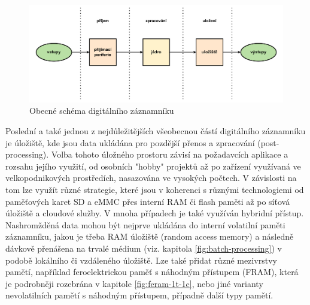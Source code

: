 \begin{figure}[h]
    \centering
    \includegraphics[width=1.00\textwidth]{obrazky-figures/common_digital_datalogger_scheme.pdf}
    \caption{Obecné schéma digitálního záznamníku}
    \label{fig:common-digital-datalogger}
\end{figure}

Poslední a také jednou z nejdůležitějších všeobecnou částí digitálního záznamníku je úložiště, kde jsou data ukládána pro pozdější přenos a zpracování (post-processing). Volba tohoto úložného prostoru závisí na požadavcích aplikace a rozsahu jejího využití, od osobních "hobby" projektů až po zařízení využívaná ve velkopodnikových prostředích, nasazována ve vysokých počtech. V závislosti na tom lze využít různé strategie, které jsou v koherenci s různými technologiemi od paměťových karet SD a eMMC přes interní RAM či flash paměti až po síťová úložiště a cloudové služby. V mnoha případech je také využíván hybridní přístup. Nashromžděná data mohou být nejprve ukládána do interní volatilní paměti záznamníku, jakou je třeba RAM úložiště (random access memory) a následně dávkově přenášena na trvalé médium (viz. kapitola \ref{fig:batch-processing}) v podobě lokálního či vzdáleného úložiště. Lze také přidat různé mezivrstvy pamětí, například feroelektrickou paměť s náhodným přístupem (FRAM), která je podrobněji rozebrána v kapitole \ref{fig:feram-1t-1c}, nebo jiné varianty nevolatilních pamětí s náhodným přístupem, případně další typy pamětí. \cite{rta_local_vs_cloud} 


